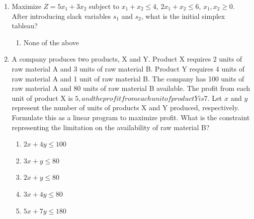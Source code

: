 \documentclass{article}%
\begin{document}
\begin{enumerate}
\begin{enumerate}%
\item $2c + 0.5k \le 50$%
\item $c + 0.25k \le 20$%
\item $2c + k \le 50$%
\item $c + 0.25k \ge 20$%
\item $2c + 0.5k \ge 50$%
\end{enumerate}%
\vspace{1em}%
\item Maximize $Z = 5x_1 + 3x_2$ subject to $x_1 + x_2 \le 4$, $2x_1 + x_2 \le 6$, $x_1, x_2 \ge 0$. After introducing slack variables $s_1$ and $s_2$, what is the initial simplex tableau?%
\begin{enumerate}%
\item None of the above%
\end{enumerate}%
\vspace{1em}%
\item A company produces two products, X and Y. Product X requires 2 units of raw material A and 3 units of raw material B. Product Y requires 4 units of raw material A and 1 unit of raw material B. The company has 100 units of raw material A and 80 units of raw material B available. The profit from each unit of product X is $5, and the profit from each unit of product Y is $7. Let $x$ and $y$ represent the number of units of products X and Y produced, respectively. Formulate this as a linear program to maximize profit. What is the constraint representing the limitation on the availability of raw material B?%
\begin{enumerate}%
\item $2x + 4y \le 100$%
\item $3x + y \le 80$%
\item $2x + y \le 80$%
\item $3x + 4y \le 80$%
\item $5x + 7y \le 180$%
\end{enumerate}%
\vspace{1em}%
\end{enumerate}

%
\newpage%
\end{document}

